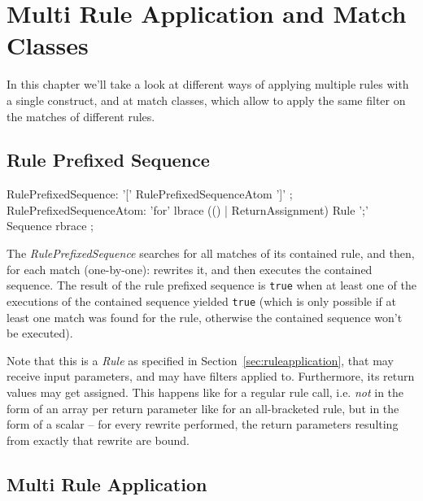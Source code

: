 \chapter{Multi Rule Application and Match Classes}
\label{cha:multiruleseq}

In this chapter we'll take a look at different ways of applying multiple rules with a single construct, and at match classes, which allow to apply the same filter on the matches of different rules.

\section{Rule Prefixed Sequence}\label{sec:ruleprefixedsequence}

\begin{rail}
  RulePrefixedSequence: '[' RulePrefixedSequenceAtom ']' ;
  RulePrefixedSequenceAtom: 'for' lbrace (() | ReturnAssignment) Rule ';' Sequence rbrace ;
\end{rail}

The \emph{RulePrefixedSequence} searches for all matches of its contained rule, and then, for each match (one-by-one): rewrites it, and then executes the contained sequence.
The result of the rule prefixed sequence is \texttt{true} when at least one of the executions of the contained sequence  yielded \texttt{true} (which is only possible if at least one match was found for the rule, otherwise the contained sequence won't be executed).

Note that this is a \emph{Rule} as specified in Section~\ref{sec:ruleapplication}, that may receive input parameters, and may have filters applied to.
Furthermore, its return values may get assigned.
This happens like for a regular rule call, i.e. \emph{not} in the form of an array per return parameter like for an all-bracketed rule, but in the form of a scalar -- for every rewrite performed, the return parameters resulting from exactly that rewrite are bound.


\section{Multi Rule Application} \label{sec:multiruleapplication}

